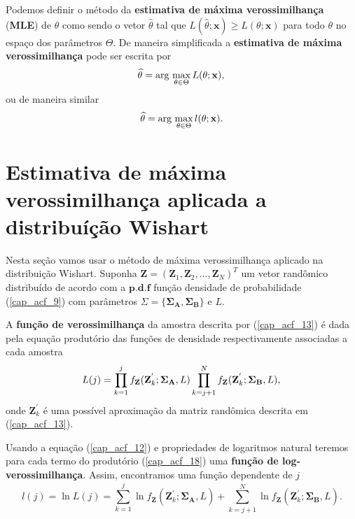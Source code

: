 Podemos definir o método da \textbf{estimativa de máxima verossimilhança} (\textbf{MLE}) de $\theta$ como sendo o vetor $\widehat{\theta}$ tal que $L(\widehat{\theta};\mathbf{x})\ge L(\theta;\mathbf{x})$ para todo $\theta$ no espaço dos parâmetros $\Theta$. De maneira simplificada a \textbf{estimativa de máxima verossimilhança} pode ser escrita por 
\begin{equation}\label{cap_acf_16}
    \widehat{\theta}= \text{arg}\,\max\limits_{\theta\in\Theta}L(\theta;\mathbf{x}),\\
\end{equation}
ou de maneira similar 
\begin{equation}\label{cap_acf_17}
    \widehat{\theta}= \text{arg}\,\max\limits_{\theta\in\Theta}l(\theta;\mathbf{x}).\\
\end{equation}

\section{Estimativa de máxima verossimilhança aplicada a distribuíção Wishart}

Nesta seção vamos usar o método de máxima verossimilhança aplicado na distribuição Wishart. Suponha $\mathbf{Z}=(\mathbf{Z}_1,\mathbf{Z}_2,\dots,\mathbf{Z}_N)^T$ um vetor randômico distribuído de acordo com a $\mathbf{p.d.f}$ função densidade de probabilidade (\ref{cap_acf_9}) com parâmetros $\Sigma=\{\mathbf{\Sigma_A}, \mathbf{\Sigma_B\}}$ e $L$.

A \textbf{função de verossimilhança} da amostra descrita por (\ref{cap_acf_13}) é dada pela equação produtório das funções de densidade respectivamente associadas a cada amostra
\begin{equation}\label{cap_acf_18}
	L(j)=\prod_{k=1}^{j}f_{\mathbf{Z}}(\mathbf{Z}_{k}^{'};\mathbf{\Sigma_{A}},L) \prod_{k=j+1}^{N}f_{\mathbf{Z}}(\mathbf{Z}_{k}^{'};\mathbf{\Sigma_{B}},L), \\
\end{equation}
onde $\mathbf{Z}_{k}^{'}$ é uma possível aproximação da matriz randômica descrita em (\ref{cap_acf_13}).

Usando a equação (\ref{cap_acf_12}) e propriedades de logaritmos natural teremos para cada termo do produtório (\ref{cap_acf_18}) uma \textbf{função de log-verossimilhança}. Assim, encontramos uma função dependente de $j$
\begin{equation}\label{cap_acf_19}
	l(j)=\ln L(j)=\sum_{k=1}^{j}\ln f_{\mathbf{Z}}(\mathbf{Z}_{k}^{'};\mathbf{\Sigma_{A}},L)+ \sum_{k=j+1}^{N}\ln f_{\mathbf{Z}}(\mathbf{Z}_{k}^{'};\mathbf{\Sigma_{B}},L).
\end{equation}

